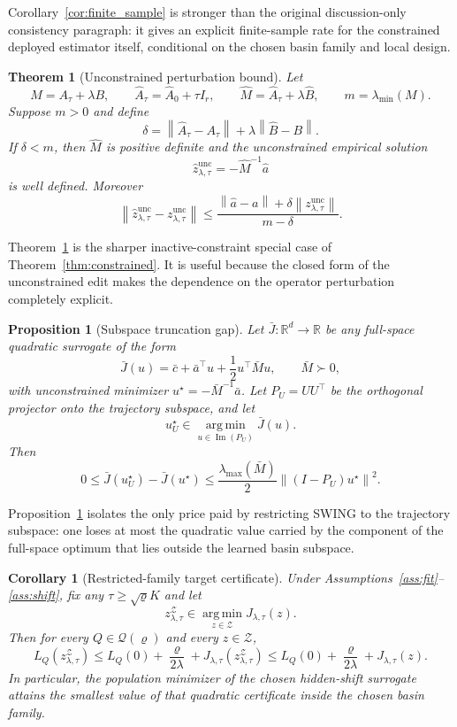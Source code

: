 \documentclass{article}
\newtheorem{theorem}{Theorem}
\newtheorem{proposition}{Proposition}
\newtheorem{corollary}{Corollary}
\newcommand{\RR}{\mathbb{R}}
\newcommand{\cQ}{\mathcal{Q}}
\newcommand{\cZ}{\mathcal{Z}}
\newcommand{\argmin}{\operatorname*{arg\,min}}
\newcommand{\swing}{\textup{\textsc{SWING}}}
\newcommand{\norm}[1]{\left\lVert #1 \right\rVert}
\begin{document}
Corollary~\ref{cor:finite_sample} is stronger than the original discussion-only consistency paragraph: it gives an explicit finite-sample rate for the constrained deployed estimator itself, conditional on the chosen basin family and local design.

\begin{theorem}[Unconstrained perturbation bound]
\label{thm:perturb}
Let
\[
M = A_\tau+\lambda B,
\qquad
\hat A_\tau = \hat A_0 + \tau I_r,
\qquad
\hat M = \hat A_\tau + \lambda \hat B,
\qquad
m = \lambda_{\min}(M).
\]
Suppose \(m>0\) and define
\[
\delta = \norm{\hat A_\tau - A_\tau} + \lambda \norm{\hat B-B}.
\]
If \(\delta < m\), then \(\hat M\) is positive definite and the unconstrained empirical solution
\[
\hat z_{\lambda,\tau}^{\mathrm{unc}} = -\hat M^{-1}\hat a
\]
is well defined. Moreover
\[
\norm{\hat z_{\lambda,\tau}^{\mathrm{unc}} - z_{\lambda,\tau}^{\mathrm{unc}}}
\le
\frac{\norm{\hat a-a} + \delta \norm{z_{\lambda,\tau}^{\mathrm{unc}}}}{m-\delta}.
\]
\end{theorem}

Theorem~\ref{thm:perturb} is the sharper inactive-constraint special case of Theorem~\ref{thm:constrained}. It is useful because the closed form of the unconstrained edit makes the dependence on the operator perturbation completely explicit.

\begin{proposition}[Subspace truncation gap]
\label{prop:subspace_gap}
Let \(\bar J:\RR^d\to\RR\) be any full-space quadratic surrogate of the form
\[
\bar J(u) = \bar c + \bar a^\top u + \frac12 u^\top \bar M u,
\qquad
\bar M \succ 0,
\]
with unconstrained minimizer \(u^\star = -\bar M^{-1}\bar a\). Let \(P_U = UU^\top\) be the orthogonal projector onto the trajectory subspace, and let
\[
u_U^\star \in \argmin_{u\in \operatorname{Im}(P_U)} \bar J(u).
\]
Then
\[
0
\le
\bar J(u_U^\star) - \bar J(u^\star)
\le
\frac{\lambda_{\max}(\bar M)}{2}\norm{(I-P_U)u^\star}^2.
\]
\end{proposition}

Proposition~\ref{prop:subspace_gap} isolates the only price paid by restricting \swing{} to the trajectory subspace: one loses at most the quadratic value carried by the component of the full-space optimum that lies outside the learned basin subspace.

\begin{corollary}[Restricted-family target certificate]
\label{cor:certificate}
Under Assumptions~\ref{ass:fit}--\ref{ass:shift}, fix any \(\tau\ge \sqrt{\varrho}K\) and let
\[
z_{\lambda,\tau}^{\cZ} \in \argmin_{z\in\cZ} J_{\lambda,\tau}(z).
\]
Then for every \(Q\in\cQ(\varrho)\) and every \(z\in\cZ\),
\[
L_Q(z_{\lambda,\tau}^{\cZ})
\le
L_Q(0) + \frac{\varrho}{2\lambda} + J_{\lambda,\tau}(z_{\lambda,\tau}^{\cZ})
\le
L_Q(0) + \frac{\varrho}{2\lambda} + J_{\lambda,\tau}(z).
\]
In particular, the population minimizer of the chosen hidden-shift surrogate attains the smallest value of that quadratic certificate inside the chosen basin family.
\end{corollary}
\end{document}
